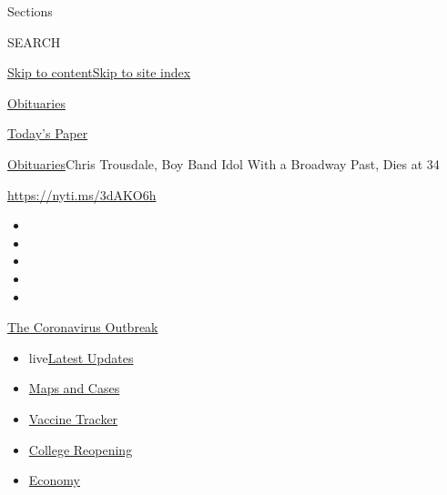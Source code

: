 Sections

SEARCH

\protect\hyperlink{site-content}{Skip to
content}\protect\hyperlink{site-index}{Skip to site index}

\href{https://www.nytimes.com/section/obituaries}{Obituaries}

\href{https://myaccount.nytimes.com/auth/login?response_type=cookie\&client_id=vi}{}

\href{https://www.nytimes.com/section/todayspaper}{Today's Paper}

\href{/section/obituaries}{Obituaries}\textbar{}Chris Trousdale, Boy
Band Idol With a Broadway Past, Dies at 34

\url{https://nyti.ms/3dAKO6h}

\begin{itemize}
\item
\item
\item
\item
\item
\end{itemize}

\href{https://www.nytimes.com/news-event/coronavirus?action=click\&pgtype=Article\&state=default\&region=TOP_BANNER\&context=storylines_menu}{The
Coronavirus Outbreak}

\begin{itemize}
\tightlist
\item
  live\href{https://www.nytimes.com/2020/08/03/world/coronavirus-covid-19.html?action=click\&pgtype=Article\&state=default\&region=TOP_BANNER\&context=storylines_menu}{Latest
  Updates}
\item
  \href{https://www.nytimes.com/interactive/2020/us/coronavirus-us-cases.html?action=click\&pgtype=Article\&state=default\&region=TOP_BANNER\&context=storylines_menu}{Maps
  and Cases}
\item
  \href{https://www.nytimes.com/interactive/2020/science/coronavirus-vaccine-tracker.html?action=click\&pgtype=Article\&state=default\&region=TOP_BANNER\&context=storylines_menu}{Vaccine
  Tracker}
\item
  \href{https://www.nytimes.com/2020/08/02/us/covid-college-reopening.html?action=click\&pgtype=Article\&state=default\&region=TOP_BANNER\&context=storylines_menu}{College
  Reopening}
\item
  \href{https://www.nytimes.com/live/2020/08/03/business/stock-market-today-coronavirus?action=click\&pgtype=Article\&state=default\&region=TOP_BANNER\&context=storylines_menu}{Economy}
\end{itemize}


